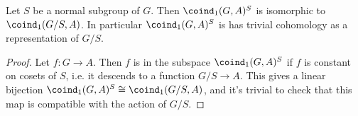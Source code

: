 

\begin{lemma}	\label{lem:coind₁ invariants}
	\leanok
	Let $S$ be a normal subgroup of $G$. Then $\coind_1(G,A)^S$ is isomorphic to $\coind_1(G/S,A)$.
	In particular $\coind_1(G,A)^S$ is has trivial cohomology as a representation of $G/S$.
\end{lemma}

\begin{proof}
	Let $f : G \to A$. Then $f$ is in the subspace $\coind_1(G,A)^S$ if $f$ is constant on
	cosets of $S$, i.e. it descends to a function $G/S \to A$.
	This gives a linear bijection $\coind_1(G,A)^S \cong \coind_1(G/S,A)$, and it's trivial to check
	that this map is compatible with the action of $G / S$.
\end{proof}

